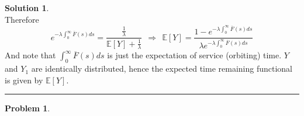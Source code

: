 \documentclass[a4paper, 10pt]{article}
\theoremstyle{definition}
\newtheorem{problem}{Problem}
\theoremstyle{hSol}
\newtheorem*{solution}{Solution}
\begin{document}
\begin{solution}
\begin{equation}
\end{equation}
Therefore
\begin{equation}
  e^{-\lambda \int_0^{\infty} \overline{F}(s)ds} = \frac{\frac{1}{\lambda}}{\mathbb{E}\left[Y\right]+\frac{1}{\lambda}}~~\Rightarrow~~\mathbb{E}\left[Y\right]=\frac{1-e^{-\lambda \int_0^{\infty} \overline{F}(s)ds}}{\lambda e^{-\lambda \int_0^{\infty} \overline{F}(s)ds}}
\end{equation}
And note that $\int_0^{\infty} \overline{F}(s)ds$ is just the expectation of service (orbiting) time. $Y$ and $Y_1$ are identically distributed, hence the expected time remaining functional is given by $\mathbb{E}\left[Y\right]$.
\end{solution}

\noindent\rule{16cm}{0.4pt}
\begin{problem} 
\end{problem}
\end{document}
